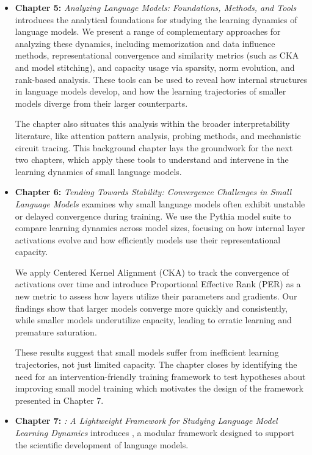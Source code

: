 \begin{itemize}
    \item \textbf{Chapter 5:} \emph{Analyzing Language Models: Foundations, Methods, and Tools} introduces the analytical foundations for studying the learning dynamics of language models. We present a range of complementary approaches for analyzing these dynamics, including memorization and data influence methods, representational convergence and similarity metrics (such as CKA and model stitching), and capacity usage via sparsity, norm evolution, and rank-based analysis. These tools can be used to reveal how internal structures in language models develop, and how the learning trajectories of smaller models diverge from their larger counterparts.

    The chapter also situates this analysis within the broader interpretability literature, like attention pattern analysis, probing methods, and mechanistic circuit tracing. This background chapter lays the groundwork for the next two chapters, which apply these tools to understand and intervene in the learning dynamics of small language models.

    \item \textbf{Chapter 6:} \emph{Tending Towards Stability: Convergence Challenges in Small Language Models} examines why small language models often exhibit unstable or delayed convergence during training. We use the Pythia model suite to compare learning dynamics across model sizes, focusing on how internal layer activations evolve and how efficiently models use their representational capacity.

    We apply Centered Kernel Alignment (CKA) to track the convergence of activations over time and introduce Proportional Effective Rank (PER) as a new metric to assess how layers utilize their parameters and gradients. Our findings show that larger models converge more quickly and consistently, while smaller models underutilize capacity, leading to erratic learning and premature saturation.
    
    These results suggest that small models suffer from inefficient learning trajectories, not just limited capacity. The chapter closes by identifying the need for an intervention-friendly training framework to test hypotheses about improving small model training which motivates the design of the \pico framework presented in Chapter 7.

    \item \textbf{Chapter 7:} \emph{\pico: A Lightweight Framework for Studying Language Model Learning Dynamics} introduces \pico, a modular framework designed to support the scientific development of language models.


\end{itemize}
